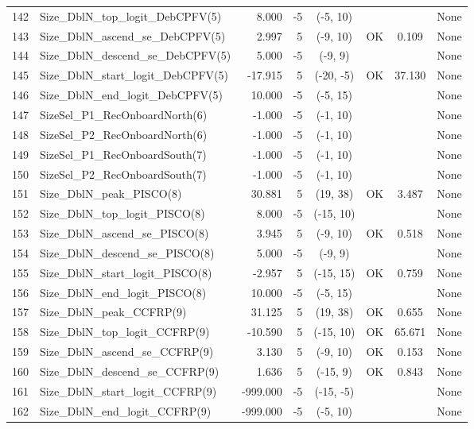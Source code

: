 \documentclass[12pt,]{article}
\begin{document}
\begin{landscape}
\begin{longtable}{rlrrcccl}
  142 & Size\_DblN\_top\_logit\_DebCPFV(5) & 8.000 & -5 & (-5, 10) &  &  & None \\ 
  143 & Size\_DblN\_ascend\_se\_DebCPFV(5) & 2.997 & 5 & (-9, 10) & OK & 0.109 & None \\ 
  144 & Size\_DblN\_descend\_se\_DebCPFV(5) & 5.000 & -5 & (-9, 9) &  &  & None \\ 
  145 & Size\_DblN\_start\_logit\_DebCPFV(5) & -17.915 & 5 & (-20, -5) & OK & 37.130 & None \\ 
  146 & Size\_DblN\_end\_logit\_DebCPFV(5) & 10.000 & -5 & (-5, 15) &  &  & None \\ 
  147 & SizeSel\_P1\_RecOnboardNorth(6) & -1.000 & -5 & (-1, 10) &  &  & None \\ 
  148 & SizeSel\_P2\_RecOnboardNorth(6) & -1.000 & -5 & (-1, 10) &  &  & None \\ 
  149 & SizeSel\_P1\_RecOnboardSouth(7) & -1.000 & -5 & (-1, 10) &  &  & None \\ 
  150 & SizeSel\_P2\_RecOnboardSouth(7) & -1.000 & -5 & (-1, 10) &  &  & None \\ 
  151 & Size\_DblN\_peak\_PISCO(8) & 30.881 & 5 & (19, 38) & OK & 3.487 & None \\ 
  152 & Size\_DblN\_top\_logit\_PISCO(8) & 8.000 & -5 & (-15, 10) &  &  & None \\ 
  153 & Size\_DblN\_ascend\_se\_PISCO(8) & 3.945 & 5 & (-9, 10) & OK & 0.518 & None \\ 
  154 & Size\_DblN\_descend\_se\_PISCO(8) & 5.000 & -5 & (-9, 9) &  &  & None \\ 
  155 & Size\_DblN\_start\_logit\_PISCO(8) & -2.957 & 5 & (-15, 15) & OK & 0.759 & None \\ 
  156 & Size\_DblN\_end\_logit\_PISCO(8) & 10.000 & -5 & (-5, 15) &  &  & None \\ 
  157 & Size\_DblN\_peak\_CCFRP(9) & 31.125 & 5 & (19, 38) & OK & 0.655 & None \\ 
  158 & Size\_DblN\_top\_logit\_CCFRP(9) & -10.590 & 5 & (-15, 10) & OK & 65.671 & None \\ 
  159 & Size\_DblN\_ascend\_se\_CCFRP(9) & 3.130 & 5 & (-9, 10) & OK & 0.153 & None \\ 
  160 & Size\_DblN\_descend\_se\_CCFRP(9) & 1.636 & 5 & (-15, 9) & OK & 0.843 & None \\ 
  161 & Size\_DblN\_start\_logit\_CCFRP(9) & -999.000 & -5 & (-15, -5) &  &  & None \\ 
  162 & Size\_DblN\_end\_logit\_CCFRP(9) & -999.000 & -5 & (-5, 10) &  &  & None \\ 

\end{longtable}
\end{landscape}
\end{document}
